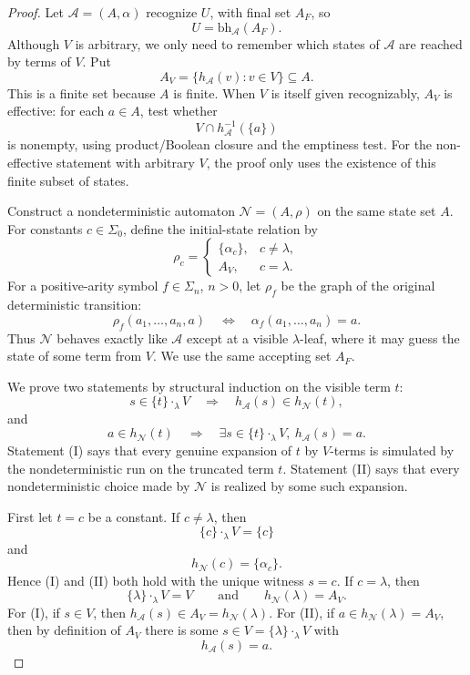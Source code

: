 \documentclass[11pt]{article}
\theoremstyle{definition}
\newcommand{\SigmaSym}{\Sigma}
\newcommand{\Aut}{\mathcal A}
\newcommand{\bh}{\mathrm{bh}}
\begin{document}
\begin{proof}
Let \(\Aut=(A,\alpha)\) recognize \(U\), with final set \(A_F\), so
\[
  U=\bh_\Aut(A_F).
\]
Although \(V\) is arbitrary, we only need to remember which states of
\(\Aut\) are reached by terms of \(V\).  Put
\[
  A_V=\{h_\Aut(v):v\in V\}\subseteq A.
\]
This is a finite set because \(A\) is finite.
When \(V\) is itself given recognizably, \(A_V\) is effective: for each
\(a\in A\), test whether
\[
  V\cap h_\Aut^{-1}(\{a\})
\]
is nonempty, using product/Boolean closure and the emptiness test.  For the
non-effective statement with arbitrary \(V\), the proof only uses the existence
of this finite subset of states.

Construct a nondeterministic automaton \(\mathcal N=(A,\rho)\) on the same state
set \(A\).  For constants \(c\in\SigmaSym_0\), define the initial-state
relation by
\[
  \rho_c=
  \begin{cases}
    \{\alpha_c\}, & c\ne\lambda,\\
    A_V,          & c=\lambda.
  \end{cases}
\]
For a positive-arity symbol \(f\in\SigmaSym_n\), \(n>0\), let \(\rho_f\) be the
graph of the original deterministic transition:
\[
  \rho_f(a_1,\ldots,a_n,a)
  \quad\Longleftrightarrow\quad
  \alpha_f(a_1,\ldots,a_n)=a.
\]
Thus \(\mathcal N\) behaves exactly like \(\Aut\) except at a visible
\(\lambda\)-leaf, where it may guess the state of some term from \(V\).  We use
the same accepting set \(A_F\).

We prove two statements by structural induction on the visible term \(t\):
\[
  s\in\{t\}\cdot_\lambda V
  \quad\Longrightarrow\quad
  h_\Aut(s)\in h_{\mathcal N}(t),             \tag{I}
\]
and
\[
  a\in h_{\mathcal N}(t)
  \quad\Longrightarrow\quad
  \exists s\in\{t\}\cdot_\lambda V,\ h_\Aut(s)=a.   \tag{II}
\]
Statement (I) says that every genuine expansion of \(t\) by \(V\)-terms is
simulated by the nondeterministic run on the truncated term \(t\).  Statement
(II) says that every nondeterministic choice made by \(\mathcal N\) is realized
by some such expansion.

First let \(t=c\) be a constant.  If \(c\ne\lambda\), then
\[
  \{c\}\cdot_\lambda V=\{c\}
\]
and
\[
  h_{\mathcal N}(c)=\{\alpha_c\}.
\]
Hence (I) and (II) both hold with the unique witness \(s=c\).  If
\(c=\lambda\), then
\[
  \{\lambda\}\cdot_\lambda V=V
  \qquad\text{and}\qquad
  h_{\mathcal N}(\lambda)=A_V.
\]
For (I), if \(s\in V\), then \(h_\Aut(s)\in A_V=h_{\mathcal N}(\lambda)\).
For (II), if \(a\in h_{\mathcal N}(\lambda)=A_V\), then by definition of
\(A_V\) there is some \(s\in V=\{\lambda\}\cdot_\lambda V\) with
\[
  h_\Aut(s)=a.
\]


\end{proof}
\end{document}
